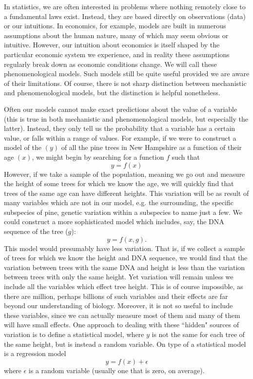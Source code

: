 In statistics, we are often interested in problems where nothing remotely close to a fundamental laws exist. Instead, they are based directly on observations (data) or our intuitions. In economics, for example, models are built in numerous assumptions about the human nature, many of which may seem obvious or intuitive. However, our intuition about economics is itself shaped by the particular economic system we experience, and in reality these assumptions regularly break down as economic conditions change.  We will call these {\dfn phenomenological models}. Such models still be quite useful provided we are aware of their limitations. Of course, there is not sharp distinction between mechanistic and phenomenological models, but the distinction is helpful nonetheless.


Often our models cannot make exact predictions about the value of a variable (this is true in both mechanistic and phenomenological models, but especially the latter). Instead, they only tell us the probability that a variable has a certain value, or falls within a range of values. For example, if we were to construct a model of the $(y)$ of all the pine trees in New Hampshire as a function of their age $(x)$, we might begin by searching for a function $f$ such that
\begin{equation}
y = f(x)
\end{equation}
However, if we take a {\dfn sample} of the population, meaning we go out and measure the height of some trees for which we know the age, we will quickly find that trees of the same age can have different heights.   This variation will be as result of many variables which are not in our model, e.g. the surrounding, the specific subspecies of pine, genetic variation within a subspecies to name just a few. We could construct a more sophisticated model which includes, say, the DNA sequence of the tree ($g$):
\begin{equation}
y = f(x,g).
\end{equation}
This model would presumably have less variation. That is, if we collect a sample of trees for which we know the height and DNA sequence, we would find that the variation between trees with the same DNA and height is less than the variation between trees with only the same height. Yet variation will remain unless we include all the variables which effect tree height. This is of course impossible, as there are million, perhaps billions of such variables and their effects are far beyond our understanding of biology. Moreover, it is not so useful to include these variables, since we can actually measure most of them and many of them will have small effects. One approach to dealing with these ``hidden" sources of variation is to define a {\dfn statistical model}, where $y$ is not the same for each tree of the same height, but is instead a {\dfn random variable}. On type of a statistical model is a regression model
\begin{equation}\label{eq:reg}
y = f(x) + \epsilon
\end{equation}
where $\epsilon$ is a random variable (usually one that is zero, on average).

